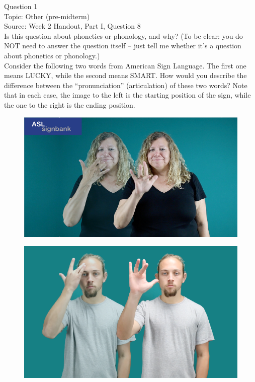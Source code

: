 \documentclass[12pt]{article}
\begin{document}
{\large Question 1}\\

Topic: Other (pre-midterm)\\
Source: Week 2 Handout, Part I, Question 8\\

Is this question about phonetics or phonology, and why? (To be clear: you do NOT need to answer the question itself -- just tell me whether it's a question about phonetics or phonology.)\\

Consider the following two words from American Sign Language. The first one means LUCKY, while the second means SMART. How would you describe the difference between the ``pronunciation'' (articulation) of these two words? Note that in each case, the image to the left is the starting position of the sign, while the one to the right is the ending position.

\begin{figure}[H]
\includegraphics{../images/asl_lucky.png}
\end{figure}
\begin{figure}[H]
\includegraphics{../images/asl_smart.png}
\end{figure}
\end{document}
